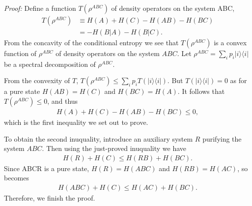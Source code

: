 \emph{Proof:} Define a function $T(\rho ^{ABC})$ of density operators on the system ABC,
\begin{align*}
T(\rho ^{ABC}) &\equiv H(A)+H(C)-H(AB)-H(BC) \\
&= -H(B|A) -H(B|C) .
\end{align*}
  From the concavity of the conditional entropy we see that $T(\rho ^{ABC})$ is a convex function of $\rho ^{ABC}$ of density operators on the system $ABC$.
Let $\rho ^{ABC} = \sum_ip_i|i \rangle \langle i|$ be a spectral decomposition of $\rho ^{ABC}$.

  From the convexity of $T$, $T(\rho ^{ABC}) \leq \sum_ip_iT(|i \rangle \langle i|)$. But $T(|i \rangle \langle i|)=0$ as for a pure state $H(AB)=H(C)$ and $H(BC)=H(A)$. It follows that $T(\rho ^{ABC}) \leq 0$, and thus
\begin{align*}
H(A)+H(C)-H(AB)-H(BC) \leq 0,
\end{align*}
which is the first inequality we set out to prove.

  To obtain the second inuquality, introduce an auxiliary system $R$ purifying the system $ABC$. Then using the just-proved inuquality we have
\begin{align*}
H(R)+H(C) \leq H(RB)+H(BC).
\end{align*}
  Since ABCR is a pure state, $H(R)=H(ABC)$ and $H(RB)=H(AC)$, so becomes
\begin{align*}
H(ABC)+H(C) \leq H(AC)+H(BC).
\end{align*}
Therefore, we finish the proof.